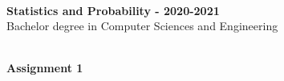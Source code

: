 \documentclass[12pt,a4]{report}
\begin{document}
\begin{flushleft}


 \vspace{-2.45cm}
 \hfill
\parbox{10.0cm}{
$\phantom{}$\hrulefill$\phantom{}$ \vspace{1ex}\\
{\bf Statistics and Probability - 2020-2021}\\

{Bachelor degree in Computer Sciences and Engineering}\\
$\phantom{}$\hrulefill$\phantom{}$ \vspace{1cm} }
\end{flushleft}

\vspace{0.5cm}

\begin{center}
{\Large \textbf{Assignment 1}}\\
\vspace{1ex}
\end{center}


%
%
%
%
%
%
%

\vspace{1cm}
\end{document}
